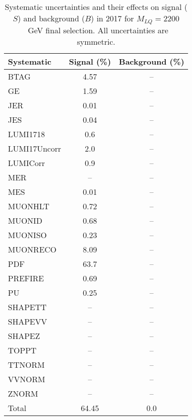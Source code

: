 \begin{table}[htbp]
\begin{center}
\caption{Systematic uncertainties and their effects on signal ($S$) and background ($B$) in 2017 for $M_{LQ}=2200$~GeV final selection. All uncertainties are symmetric.}
\begin{tabular}{lcc}
\hline\hline
Systematic & Signal (\%) & Background (\%) \\ \hline 
BTAG & 4.57 & --\\ 
GE & 1.59 & --\\ 
JER & 0.01 & --\\ 
JES & 0.04 & --\\ 
LUMI1718 & 0.6 & --\\ 
LUMI17Uncorr & 2.0 & --\\ 
LUMICorr & 0.9 & --\\ 
MER & -- & --\\ 
MES & 0.01 & --\\ 
MUONHLT & 0.72 & --\\ 
MUONID & 0.68 & --\\ 
MUONISO & 0.23 & --\\ 
MUONRECO & 8.09 & --\\ 
PDF & 63.7 & --\\ 
PREFIRE & 0.69 & --\\ 
PU & 0.25 & --\\ 
SHAPETT & -- & --\\ 
SHAPEVV & -- & --\\ 
SHAPEZ & -- & --\\ 
TOPPT & -- & --\\ 
TTNORM & -- & --\\ 
VVNORM & -- & --\\ 
ZNORM & -- & --\\ 
Total & 64.45 & 0.0\\ \hline \hline
\end{tabular}
\label{tab:SysUncertainties_uujj_2200}
\end{center}
\end{table}

